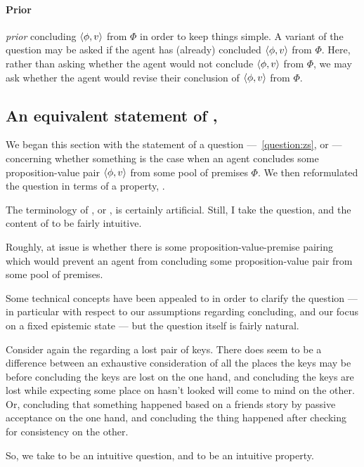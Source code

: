 \paragraph*{Prior}

\begin{note}
  \emph{prior} concluding \(\langle \phi, v \rangle\) from \(\Phi\) in order to keep things simple.
  A variant of the question may be asked if the agent has (already) concluded \(\langle \phi, v \rangle\) from \(\Phi\).
  Here, rather than asking whether the agent would not conclude \(\langle \phi, v \rangle\) from \(\Phi\), we may ask whether the agent would revise their conclusion of \(\langle \phi, v \rangle\) from \(\Phi\).
\end{note}

\subsection{An equivalent statement of \zs{}, \Zs{}}
\label{sec:overview:an-equiv-stat-of-zs}

\begin{note}
  We began this section with the statement of a question ---~\autoref{question:zs}, or \qzs{}  --- concerning whether something is the case when an agent concludes some proposition-value pair \(\langle \phi, v \rangle\) from some pool of premises \(\Phi\).
  We then reformulated the question in terms of a property, \zs{}.

  The terminology of \zs{}, or , is certainly artificial.
  Still, I take the question, and the content of \zs{} to be fairly intuitive.

  Roughly, at issue is whether there is some proposition-value-premise pairing which would prevent an agent from concluding some proposition-value pair from some pool of premises.

  Some technical concepts have been appealed to in order to clarify the question --- in particular with respect to our assumptions regarding concluding, and our focus on a fixed epistemic state --- but the question itself is fairly natural.

  Consider again the  regarding a lost pair of keys.
  There does seem to be a difference between an exhaustive consideration of all the places the keys may be before concluding the keys are lost on the one hand, and concluding the keys are lost while expecting some place on hasn't looked will come to mind on the other.
  Or, concluding that something happened based on a friends story by passive acceptance on the one hand, and concluding the thing happened after checking for consistency on the other.

  So, we take \qzs{} to be an intuitive question, and \zs{} to be an intuitive property.
\end{note}

